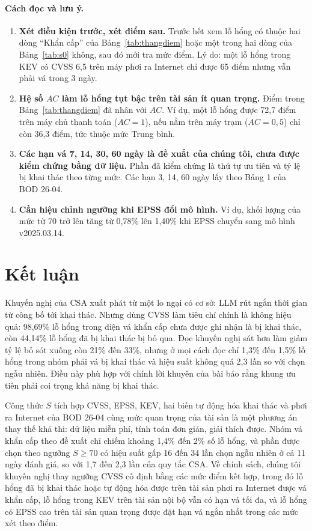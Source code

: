 \documentclass[conference]{IEEEtran}
\begin{document}
\paragraph{Cách đọc và lưu ý.}
\begin{enumerate}
\item \textbf{Xét điều kiện trước, xét điểm sau.} Trước hết xem lỗ hổng có thuộc hai dòng ``Khẩn cấp'' của
Bảng~\ref{tab:thangdiem} hoặc một trong hai dòng của Bảng~\ref{tab:s0} không, sau đó mới tra mức điểm. Lý do: một lỗ
hổng trong KEV có CVSS 6,5 trên máy phơi ra Internet chỉ được 65 điểm nhưng vẫn phải vá trong 3 ngày.
\item \textbf{Hệ số $AC$ làm lỗ hổng tụt bậc trên tài sản ít quan trọng.} Điểm trong Bảng~\ref{tab:thangdiem} đã nhân
với $AC$. Ví dụ, một lỗ hổng được 72,7 điểm trên máy chủ thanh toán ($AC = 1$), nếu nằm trên máy trạm ($AC = 0{,}5$) chỉ
còn 36,3 điểm, tức thuộc mức Trung bình.
\item \textbf{Các hạn vá 7, 14, 30, 60 ngày là đề xuất của chúng tôi, chưa được kiểm chứng bằng dữ liệu.} Phần đã kiểm
chứng là thứ tự ưu tiên và tỷ lệ bị khai thác theo từng mức. Các hạn 3, 14, 60 ngày lấy theo Bảng 1 của BOD 26-04.
\item \textbf{Cần hiệu chỉnh ngưỡng khi EPSS đổi mô hình.} Ví dụ, khối lượng của mức từ 70 trở lên tăng từ 0,78\% lên 1,40\% khi
EPSS chuyển sang mô hình v2025.03.14.
\end{enumerate}

\section{Kết luận}

Khuyến nghị của CSA xuất phát từ một lo ngại có cơ sở: LLM rút ngắn thời gian từ công bố tới khai
thác. Nhưng dùng CVSS làm tiêu chí chính là không hiệu quả: 98,69\% lỗ hổng trong diện vá khẩn cấp
chưa được ghi nhận là bị khai thác, còn 44,14\% lỗ hổng đã bị khai thác bị bỏ qua. Đọc khuyến nghị sát hơn làm
giảm tỷ lệ bỏ sót xuống còn 21\% đến 33\%, nhưng ở mọi cách đọc chỉ 1,3\% đến 1,5\% lỗ hổng trong nhóm phải vá
bị khai thác và hiệu suất không quá 2,3 lần so với chọn ngẫu nhiên. Điều này
phù hợp với chính lời khuyên của bài báo rằng khung ưu tiên phải coi trọng khả năng bị khai thác.

Công thức $S$ tích hợp CVSS, EPSS, KEV, hai biến tự động hóa khai thác và phơi ra Internet của BOD 26-04 cùng mức quan trọng của tài sản là một phương án thay thế khả thi: dữ liệu miễn phí, tính toán đơn giản, giải thích được.
Nhóm vá khẩn cấp theo đề xuất chỉ chiếm khoảng 1,4\% đến 2\% số lỗ hổng, và phần được chọn theo ngưỡng
$S \ge 70$ có hiệu suất gấp 16 đến 34 lần chọn ngẫu nhiên ở cả 11 ngày đánh giá, so với 1,7 đến 2,3 lần của quy
tắc CSA. Về chính sách, chúng tôi khuyến nghị thay
ngưỡng CVSS cố định bằng các mức điểm kết hợp, trong đó lỗ hổng đã bị khai thác hoặc tự động hóa được trên tài sản phơi ra Internet được vá khẩn cấp, lỗ hổng trong KEV trên tài sản nội bộ vẫn có hạn vá tối đa, và lỗ hổng có EPSS cao trên tài sản quan trọng được đặt hạn vá ngắn nhất trong các mức xét theo điểm.
\end{document}
